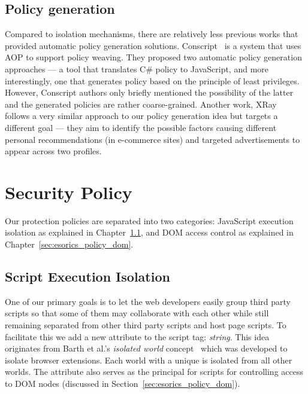 \subsection{Policy generation}\label{sec:esoricsRelatedPolicy} Compared to isolation mechanisms, there are relatively less previous works that provided automatic policy generation solutions.  Conscript~\cite{Conscript} is a system that uses AOP to support policy weaving.  They proposed two automatic policy generation approaches --- a tool that translates C\# policy to JavaScript, and more interestingly, one that generates policy based on the principle of least privileges.  However, Conscript authors only briefly mentioned the possibility of the latter and the generated policies are rather coarse-grained.  Another work, XRay\footnotemark[1]~\cite{XRay} follows a very similar approach to our policy generation idea but targets a different goal --- they aim to identify the possible factors causing different personal recommendations (in e-commerce sites) and targeted advertisements to appear across two profiles.


\renewcommand{\thefootnote}{\arabic{footnote}}

\section{Security Policy}
\label{sec:esorics_policy}

Our protection policies are separated into two categories: JavaScript execution isolation as explained in Chapter~\ref{sec:esorics_policy_iso}, and DOM access control as explained in Chapter~\ref{sec:esorics_policy_dom}.

\subsection{Script Execution Isolation} 
\label{sec:esorics_policy_iso}
One of our primary goals is to let the web developers easily group third party scripts so that some of them may collaborate with each other while still remaining separated from other third party scripts and host page scripts.  To facilitate this we add a new attribute to the script tag: \emph{string}.  This idea originates from Barth et al.'s \emph{isolated world} concept~\cite{extension} which was developed to isolate browser extensions.  Each world with a unique  is isolated from all other worlds.  The  attribute also serves as the principal for scripts for controlling access to DOM nodes (discussed in Section~\ref{sec:esorics_policy_dom}).
\lstset{xleftmargin=.25\textwidth,xrightmargin=.1\textwidth}


